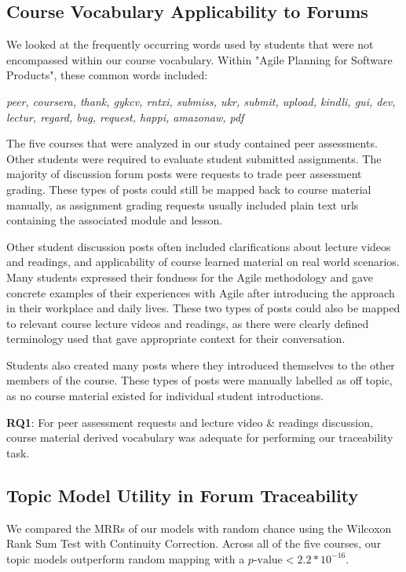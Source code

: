 \documentclass[sigconf, anonymous]{acmart}
\begin{document}
\subsection{Course Vocabulary Applicability to Forums}
We looked at the frequently occurring words used by students that were not encompassed within our course vocabulary. Within "Agile Planning for Software Products", these common words included:

\begin{center}
\emph{
    peer, coursera, thank, gykcv, rntxi, submiss, ukr, submit, upload, kindli, gui, dev, lectur, regard, bug, request, happi, amazonaw, pdf
}
\end{center}

The five courses that were analyzed in our study contained peer assessments.
Other students were required to evaluate student submitted assignments.
The majority of discussion forum posts were requests to trade peer assessment grading.
These types of posts could still be mapped back to course material manually, as  assignment grading requests usually included plain text urls containing the associated module and lesson.

Other student discussion posts often included clarifications about lecture videos and readings, and applicability of course learned material on real world scenarios.
Many students expressed their fondness for the Agile methodology and gave concrete examples of their experiences with Agile after introducing the approach in their workplace and daily lives.
These two types of posts could also be mapped to relevant course lecture videos and readings, as there were clearly defined terminology used that gave appropriate context for their conversation.

Students also created many posts where they introduced themselves to the other members of the course. 
These types of posts were manually labelled as off topic, as no course material existed for individual student introductions.

\begin{tcolorbox}[sharp corners, top=1mm, bottom=1mm]
\textbf{RQ1}: For peer assessment requests and lecture video \& readings discussion, course material derived vocabulary was adequate for performing our traceability task.
\end{tcolorbox}

\subsection{Topic Model Utility in Forum Traceability}
We compared the MRRs of our models with random chance using the Wilcoxon Rank Sum Test with Continuity Correction.
Across all of the five courses, our topic models outperform random mapping with a $p\text{-value} < 2.2 * 10^{-16}$.
\end{document}
